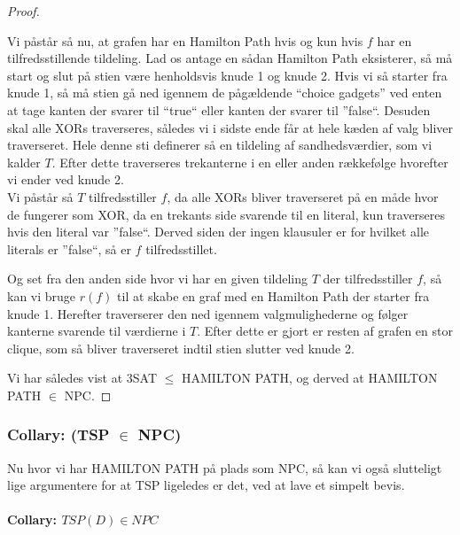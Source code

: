 \begin{proof}
\begin{center}
\end{center}
Vi påstår så nu, at grafen har en Hamilton Path hvis og kun hvis $f$ har en tilfredsstillende tildeling. Lad os antage en sådan Hamilton Path eksisterer, så må start og slut på stien være henholdsvis knude 1 og knude 2. Hvis vi så starter fra knude 1, så må stien gå ned igennem de pågældende ``choice gadgets'' ved enten at tage kanten der svarer til ``true`` eller kanten der svarer til ''false``. Desuden skal alle XORs traverseres, således vi i sidste ende får at hele kæden af valg bliver traverseret. Hele denne sti definerer så en tildeling af sandhedsværdier, som vi kalder $T$. Efter dette traverseres trekanterne i en eller anden rækkefølge hvorefter vi ender ved knude 2.\\

Vi påstår så $T$ tilfredsstiller $f$, da alle XORs bliver traverseret på en måde hvor de fungerer som XOR, da en trekants side svarende til en literal, kun traverseres hvis den literal var ''false``. Derved siden der ingen klausuler er for hvilket alle literals er ''false``, så er $f$ tilfredsstillet.

Og set fra den anden side hvor vi har en given tildeling $T$ der tilfredsstiller $f$, så kan vi bruge $r(f)$ til at skabe en graf med en Hamilton Path der starter fra knude 1. Herefter traverserer den ned igennem valgmulighederne og følger kanterne svarende til værdierne i $T$. Efter dette er gjort er resten af grafen en stor clique, som så bliver traverseret indtil stien slutter ved knude 2.

Vi har således vist at 3SAT $\leq$ HAMILTON PATH, og derved at HAMILTON PATH $\in$ NPC.
\end{proof}


\subsubsection{Collary: (TSP $\in$ NPC)}

Nu hvor vi har HAMILTON PATH på plads som NPC, så kan vi også slutteligt lige argumentere for at TSP ligeledes er det, ved at lave et  simpelt bevis.\\
~\\
\textbf{Collary: $TSP(D) \in NPC$}

